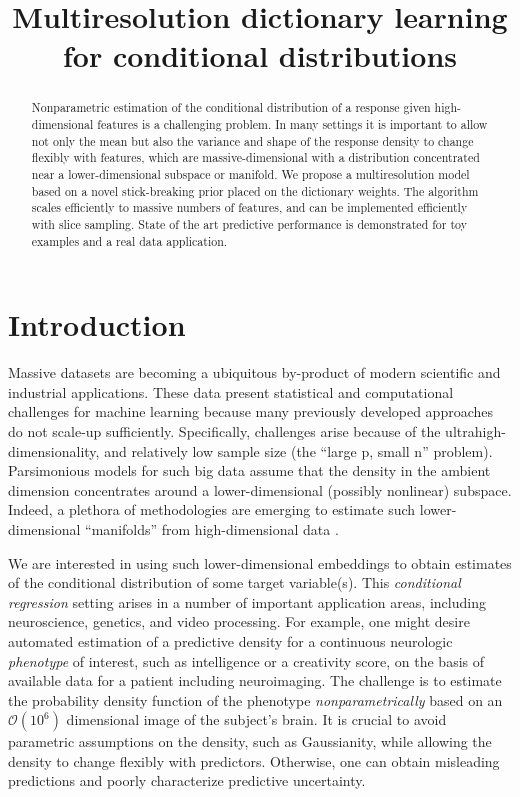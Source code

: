 \documentclass{article} %
\title{Multiresolution dictionary learning for conditional distributions}
\begin{document}
\maketitle

\begin{abstract}
Nonparametric estimation of the conditional distribution of a response given high-dimensional features is a challenging problem.  In many settings it is important to allow not only the mean but also the variance and shape of the response density to change flexibly with features, which are massive-dimensional with a distribution concentrated near a lower-dimensional subspace or manifold.  We propose a  multiresolution model based on a novel stick-breaking prior placed on the dictionary weights.  The algorithm scales efficiently to massive numbers of features, and can be implemented efficiently with slice sampling.  State of the art predictive performance is demonstrated for toy examples and a real data application.
\end{abstract}


\section{Introduction}

Massive datasets are becoming a ubiquitous by-product of modern scientific and industrial applications. These data present statistical and computational challenges for machine learning because many previously developed approaches do not scale-up sufficiently.  Specifically, challenges arise because of the ultrahigh-dimensionality, and relatively low sample size (the ``large p, small n'' problem).  Parsimonious models for such big data assume that the density in the ambient dimension concentrates around a lower-dimensional (possibly nonlinear) subspace.  Indeed, a plethora of methodologies are emerging to estimate such lower-dimensional ``manifolds'' from high-dimensional data \cite{Manifold, Maggioni}.  

We are interested in using such lower-dimensional embeddings to obtain estimates of the conditional distribution of some target variable(s).  This \emph{conditional regression} setting arises in a number of important application areas, including neuroscience, genetics, and video processing.  For example, one might desire automated estimation of a predictive density for a continuous neurologic {\em phenotype} of interest, such as intelligence or a creativity score, on the basis of available data for a patient including neuroimaging.  The challenge is to estimate the probability density function of the phenotype {\em nonparametrically} based on an $\mathcal{O}(10^6)$ dimensional image of the subject's brain.  It is crucial to avoid parametric assumptions on the density, such as Gaussianity, while allowing the density to change flexibly with predictors.  Otherwise, one can obtain misleading predictions and poorly characterize predictive uncertainty.
\end{document}
